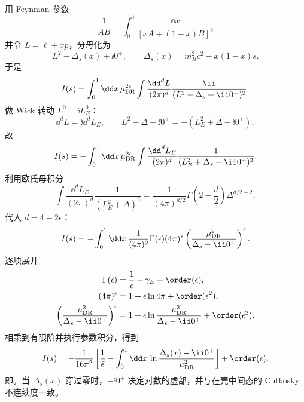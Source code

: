 \begin{derivation}
用 Feynman 参数
\begin{equation*}
 \frac1{AB}=\int_0^1\frac{\dd x}{[xA+(1-x)B]^2}
\end{equation*}
并令 \(L=\ell+xp\)，分母化为
\begin{equation*}
 L^2-\Delta_s(x)+\ii0^+,
 \qquad
 \Delta_s(x)=m_R^2c^2-x(1-x)s.
\end{equation*}
于是
\begin{equation*}
 I(s)=\int_0^1\dd x\,
 \mu_{\rm DR}^{2\epsilon}
 \int\frac{\dd^d L}{(2\pi)^d}
 \frac{\ii}{(L^2-\Delta_s+\ii0^+)^2}.
\end{equation*}
做 Wick 转动 \(L^0=\ii L_E^0\)：
\begin{equation*}
 \dd^d L=\ii\dd^d L_E,
 \qquad
 L^2-\Delta+\ii0^+=-(L_E^2+\Delta-\ii0^+),
\end{equation*}
故
\begin{equation*}
 I(s)=-\int_0^1\dd x\,
 \mu_{\rm DR}^{2\epsilon}
 \int\frac{\dd^d L_E}{(2\pi)^d}
 \frac1{(L_E^2+\Delta_s-\ii0^+)^2}.
\end{equation*}
利用欧氏母积分
\begin{equation*}
 \int\frac{\dd^d L_E}{(2\pi)^d}
 \frac1{(L_E^2+\Delta)^2}
 =\frac1{(4\pi)^{d/2}}
 \Gamma\!\left(2-\frac d2\right)
 \Delta^{d/2-2},
\end{equation*}
代入 \(d=4-2\epsilon\)：
\begin{equation*}
 I(s)=-\int_0^1\dd x\,
 \frac1{(4\pi)^2}
 \Gamma(\epsilon)(4\pi)^\epsilon
 \left(\frac{\mu_{\rm DR}^2}{\Delta_s-\ii0^+}\right)^\epsilon.
\end{equation*}
逐项展开
\begin{align*}
 \Gamma(\epsilon)&=\frac1\epsilon-\gamma_E+\order(\epsilon),\\
 (4\pi)^\epsilon&=1+\epsilon\ln4\pi+\order(\epsilon^2),\\
 \left(\frac{\mu_{\rm DR}^2}{\Delta_s-\ii0^+}\right)^\epsilon
 &=1+\epsilon\ln\frac{\mu_{\rm DR}^2}{\Delta_s-\ii0^+}
 +\order(\epsilon^2).
\end{align*}
相乘到有限阶并执行参数积分，得到
\begin{equation*}
 I(s)=-\frac1{16\pi^2}
 \left[
 \frac1{\bar\epsilon}
 -\int_0^1\dd x\,
 \ln\frac{\Delta_s(x)-\ii0^+}{\mu_{\rm DR}^2}
 \right]+
 \order(\epsilon),
\end{equation*}
即。当 \(\Delta_s(x)\) 穿过零时，\(-\ii0^+\) 决定对数的虚部，并与在壳中间态的 Cutkosky 不连续度一致。
\end{derivation}

